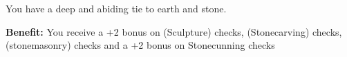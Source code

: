 
You have a deep and abiding tie to earth and stone.

\textbf{Benefit:} You receive a +2 bonus on  (Sculpture) checks,  (Stonecarving) checks,  (stonemasonry) checks and a +2 bonus on Stonecunning checks